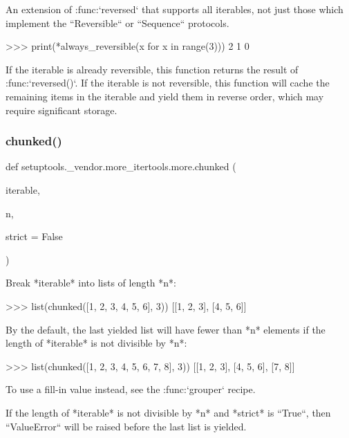 \begin{DoxyVerb}An extension of :func:`reversed` that supports all iterables, not
just those which implement the ``Reversible`` or ``Sequence`` protocols.

    >>> print(*always_reversible(x for x in range(3)))
    2 1 0

If the iterable is already reversible, this function returns the
result of :func:`reversed()`. If the iterable is not reversible,
this function will cache the remaining items in the iterable and
yield them in reverse order, which may require significant storage.
\end{DoxyVerb}
 \mbox{\label{namespacesetuptools_1_1__vendor_1_1more__itertools_1_1more_a4e54f042cb33c767fc916b14cc8f1a29}} 
\subsubsection{\texorpdfstring{chunked()}{chunked()}}
{\footnotesize\ttfamily def setuptools.\+\_\+vendor.\+more\+\_\+itertools.\+more.\+chunked (\begin{DoxyParamCaption}\item[{}]{iterable,  }\item[{}]{n,  }\item[{}]{strict = {\ttfamily False} }\end{DoxyParamCaption})}

\begin{DoxyVerb}Break *iterable* into lists of length *n*:

    >>> list(chunked([1, 2, 3, 4, 5, 6], 3))
    [[1, 2, 3], [4, 5, 6]]

By the default, the last yielded list will have fewer than *n* elements
if the length of *iterable* is not divisible by *n*:

    >>> list(chunked([1, 2, 3, 4, 5, 6, 7, 8], 3))
    [[1, 2, 3], [4, 5, 6], [7, 8]]

To use a fill-in value instead, see the :func:`grouper` recipe.

If the length of *iterable* is not divisible by *n* and *strict* is
``True``, then ``ValueError`` will be raised before the last
list is yielded.\end{DoxyVerb}
 \mbox{\label{namespacesetuptools_1_1__vendor_1_1more__itertools_1_1more_a649ba5fe06cf09fd37714753885ba36a}} 
